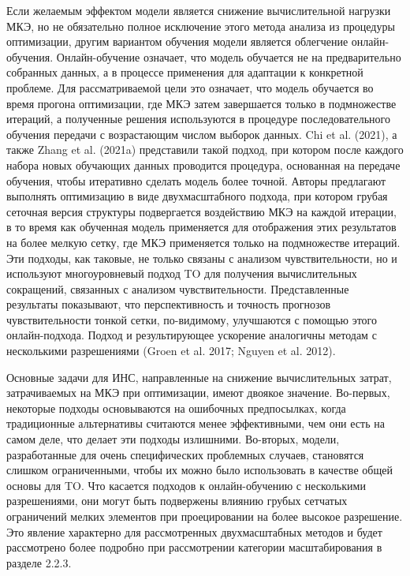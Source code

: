 Если желаемым эффектом модели является снижение вычислительной нагрузки МКЭ, но не обязательно полное исключение этого метода анализа из процедуры оптимизации, другим вариантом обучения модели является облегчение онлайн-обучения. Онлайн-обучение означает, что модель обучается не на предварительно собранных данных, а в процессе применения для адаптации к конкретной проблеме. Для рассматриваемой цели это означает, что модель обучается во время прогона оптимизации, где МКЭ затем завершается только в подмножестве итераций, а полученные решения используются в процедуре последовательного обучения передачи с возрастающим числом выборок данных. Chi et al. (2021), а также Zhang et al. (2021a) представили такой подход, при котором после каждого набора новых обучающих данных проводится процедура, основанная на передаче обучения, чтобы итеративно сделать модель более точной. Авторы предлагают выполнять оптимизацию в виде двухмасштабного подхода, при котором грубая сеточная версия структуры подвергается воздействию МКЭ на каждой итерации, в то время как обученная модель применяется для отображения этих результатов на более мелкую сетку, где МКЭ применяется только на подмножестве итераций. Эти подходы, как таковые, не только связаны с анализом чувствительности, но и используют многоуровневый подход TO для получения вычислительных сокращений, связанных с анализом чувствительности. Представленные результаты показывают, что перспективность и точность прогнозов чувствительности тонкой сетки, по-видимому, улучшаются с помощью этого онлайн-подхода. Подход и результирующее ускорение аналогичны методам с несколькими разрешениями (Groen et al. 2017; Nguyen et al. 2012).

Основные задачи для ИНС, направленные на снижение вычислительных затрат, затрачиваемых на МКЭ при оптимизации, имеют двоякое значение. Во-первых, некоторые подходы основываются на ошибочных предпосылках, когда традиционные альтернативы считаются менее эффективными, чем они есть на самом деле, что делает эти подходы излишними. Во-вторых, модели, разработанные для очень специфических проблемных случаев, становятся слишком ограниченными, чтобы их можно было использовать в качестве общей основы для TO. Что касается подходов к онлайн-обучению с несколькими разрешениями, они могут быть подвержены влиянию грубых сетчатых ограничений мелких элементов при проецировании на более высокое разрешение. Это явление характерно для рассмотренных двухмасштабных методов и будет рассмотрено более подробно при рассмотрении категории масштабирования в разделе 2.2.3.

